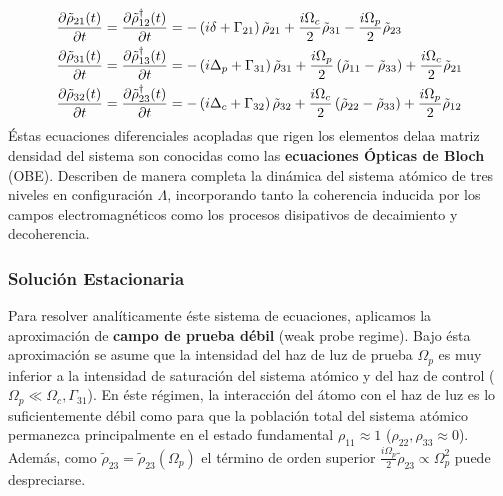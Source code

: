 \begin{equation}
    \begin{split}
        \pdv{\tilde{\rho}_{21}(t)}{t} &= \pdv{\tilde{\rho}_{12}^{\dagger}(t)}{t} = -\left(i\delta + \Gamma_{21}\right)\tilde{\rho}_{21} + \frac{i\Omega_c}{2}\tilde{\rho}_{31} - \frac{i \Omega_p}{2}\tilde{\rho}_{23}\\
        \pdv{\tilde{\rho}_{31}(t)}{t} &= \pdv{\tilde{\rho}_{13}^{\dagger}(t)}{t} =  -\left(i \Delta_p +\Gamma_{31}\right)\tilde{\rho}_{31} + \frac{i\Omega_p}{2} \left(\tilde{\rho}_{11} - \tilde{\rho}_{33} \right) + \frac{i\Omega_c}{2} \tilde{\rho}_{21}\\
        \pdv{\tilde{\rho}_{32}(t)}{t} &= \pdv{\tilde{\rho}_{23}^{\dagger}(t)}{t} = -\left(i\Delta_c + \Gamma_{32}\right)\tilde{\rho}_{32} + \frac{i\Omega_c}{2} \left(\tilde{\rho}_{22} - \tilde{\rho}_{33} \right) + \frac{i\Omega_p}{2} \tilde{\rho}_{12}\\
    \end{split}
\end{equation}
Éstas ecuaciones diferenciales acopladas que rigen los elementos delaa matriz densidad del sistema son conocidas como las \textbf{ecuaciones Ópticas de Bloch} (OBE). Describen de manera completa la dinámica del sistema atómico de tres niveles en configuración $\Lambda$, incorporando tanto la coherencia inducida por los campos electromagnéticos como los procesos disipativos de decaimiento y decoherencia.

\subsubsection*{Solución Estacionaria}
Para resolver analíticamente éste sistema de ecuaciones, aplicamos la aproximación de \textbf{campo de prueba débil} (weak probe regime). Bajo ésta aproximación se asume que la intensidad del haz de luz de prueba $\Omega_p$ es muy inferior a la intensidad de saturación del sistema atómico y del haz de control ($\Omega_p \ll \Omega_c, \Gamma_{31}$). En éste régimen, la interacción del átomo con el haz de luz es lo suficientemente débil como para que la población total del sistema atómico permanezca principalmente en el estado fundamental $\rho_{11} \approx 1$ ($\rho_{22}, \rho_{33} \approx 0$). Además, como $\tilde{\rho}_{23} = \tilde{\rho}_{23}(\Omega_p)$ el término de orden superior $\frac{i\Omega_p}{2} \tilde{\rho}_{23} \propto \Omega_p^2$ puede despreciarse. 

